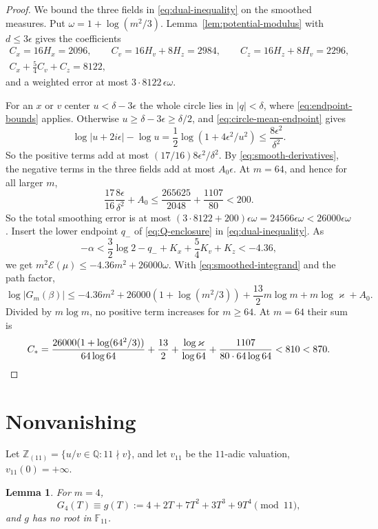 \documentclass{amsart}
\newtheorem{lemma}{Lemma}[section]
\numberwithin{equation}{section}
\numberwithin{table}{section}
\newcommand{\Z}{\mathbb{Z}}
\begin{document}
\begin{proof}
We bound the three fields in \eqref{eq:dual-inequality} on the smoothed
measures. Put $\omega=1+\log(m^2/3)$.
Lemma~\ref{lem:potential-modulus} with $d\le3\epsilon$ gives the
coefficients
\begin{gather*}
 C_x=16H_x=2096,\qquad
 C_v=16H_v+8H_z=2984,\qquad
 C_z=16H_z+8H_v=2296,\\
 C_x+\tfrac54C_v+C_z=8122,
\end{gather*}
and a weighted error at most $3\cdot8122\,\epsilon\omega$.

For an $x$ or $v$ center $u<\delta-3\epsilon$ the whole circle lies in
$|q|<\delta$, where \eqref{eq:endpoint-bounds} applies. Otherwise
$u\ge\delta-3\epsilon\ge\delta/2$, and \eqref{eq:circle-mean-endpoint}
gives
\[
 \log|u+2i\epsilon|-\log u
 =\frac12\log(1+4\epsilon^2/u^2)
 \le\frac{8\epsilon^2}{\delta^2}.
\]
So the positive terms add at most $(17/16)8\epsilon^2/\delta^2$. By
\eqref{eq:smooth-derivatives}, the negative terms in the three fields add
at most $A_0\epsilon$. At $m=64$, and hence for all larger $m$,
\begin{equation*}
 \frac{17}{16}\frac{8\epsilon}{\delta^2}+A_0
 \le\frac{265625}{2048}+\frac{1107}{80}<200.
\end{equation*}
So the total smoothing error is at most
$(3\cdot8122+200)\epsilon\omega=24566\epsilon\omega<26000\epsilon\omega$.
Insert the lower endpoint $q_-$ of \eqref{eq:Q-enclosure} in
\eqref{eq:dual-inequality}. As
\[
 -\alpha<\frac32\log2-q_-+K_x+\frac54K_v+K_z<-4.36,
\]
we get $m^2\mathcal E(\mu)\le-4.36m^2+26000\omega$. With
\eqref{eq:smoothed-integrand} and the path factor,
\[
 \log|G_m(\beta)|\le-4.36m^2+26000(1+\log(m^2/3))
              +\frac{13}{2}m\log m+m\log \varkappa+A_0.
\]
Divided by $m\log m$, no positive term increases for $m\ge64$. At $m=64$
their sum is
\begin{equation*}
 C_*=
 \frac{26000(1+\log(64^2/3))}{64\log64}
 +\frac{13}{2}+\frac{\log \varkappa}{\log64}
 +\frac{1107}{80\cdot64\log64}
 <810<870.\qedhere
\end{equation*}
\end{proof}

\section{Nonvanishing}\label{sec:nonvanishing}

Let $\Z_{(11)}=\{u/v\in\mathbb Q:11\nmid v\}$, and let $v_{11}$ be the
$11$-adic valuation, $v_{11}(0)=+\infty$.

\begin{lemma}\label{lem:g-mod-eleven}
For $m=4$,
\begin{equation}\label{eq:g-mod-eleven}
G_4(T)\equiv g(T):=4+2T+7T^2+3T^3+9T^4\pmod {11},
\end{equation}
and $g$ has no root in $\mathbb F_{11}$.
\end{lemma}
\end{document}
